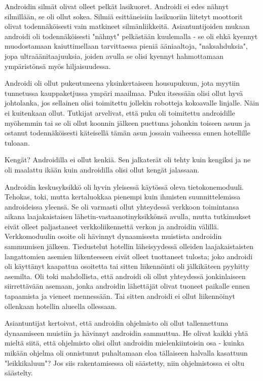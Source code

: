 Androidin silmät olivat olleet pelkät lasikuoret. Androidi ei edes nähnyt silmillään, se oli ollut sokea. Silmiä esittäneisiin lasikuoriin liitetyt moottorit olivat todennäköisesti vain matkineet silmänliikkeitä. Asiantuntijoiden mukaan androidi oli todennäköisesti "nähnyt" pelkästään kuulemalla - se oli ehkä kyennyt muodostamaan kaiuttimellaan tarvittaessa pieniä ääniaaltoja, "naksahduksia", jopa ultraäänitaajuuksia, joiden avulla se olisi kyennyt hahmottamaan ympäristönsä myös hiljaisuudessa.


Androidi oli ollut pukeutuneena yksinkertaiseen housupukuun, jota myytiin tunnetussa kauppaketjussa ympäri maailmaa. Puku itsessään olisi ollut hyvä johtolanka, jos sellainen olisi toimitettu jollekin robotteja kokoavalle linjalle. Näin ei kuitenkaan ollut. Tutkijat arvelivat, että puku oli toimitettu androidille myöhemmin tai se oli ollut koonnin jälkeen puettuna johonkin toiseen asuun ja ostanut todennäköisesti käteisellä tämän asun jossain vaiheessa ennen hotellille tuloaan.


Kengät? Androidilla ei ollut kenkiä. Sen jalkaterät oli tehty kuin kengiksi ja ne oli maalattu ikään kuin androidilla olisi ollut kengät jalassaan.


Androidin keskusyksikkö oli hyvin yleisessä käytössä oleva tietokonemoduuli. Tehokas, toki, mutta kertaluokkaa pienempi kuin ihmisten suunnittelemissa androideissa yleensä. Se oli varmasti ollut yhteydessä verkkoon toimintansa aikana laajakaistaisen lähetin-vastaanotinyksikkönsä avulla, mutta tutkimukset eivät olleet paljastaneet verkkoliikennettä verkon ja androidin välillä. Verkkomoduulin osoite oli hävinnyt dynaamisesta muistista androidin sammumisen jälkeen. Tiedustelut hotellin läheisyydessä olleiden laajakaistaisten langattomien asemien liikenteeseen eivät olleet tuottaneet tulosta; joko androidi oli käyttänyt kaapattua osoitetta tai sitten liikennöinti oli jälkikäteen pyyhitty asemilta. Oli toki mahdollista, että androidi oli ollut yhteydessä jonkinlaiseen siirrettävään asemaan, jonka androidin lähettäjät olivat tuoneet paikalle ennen tapaamista ja vieneet mennessään. Tai sitten androidi ei ollut liikennöinyt ollenkaan hotellin alueella ollessaan.


Asiantuntijat kertoivat, että androidin ohjelmisto oli ollut tallennettuna dynaamiseen muistiin ja hävinnyt androidin sammuttua. He olivat kaikki yhtä mieltä siitä, että ohjelmisto olisi ollut androidin mielenkiintoisin osa - kuinka mikään ohjelma oli onnistunut puhaltamaan eloa tällaiseen halvalla kasattuun "leikkikaluun"? Jos siis rakentamisessa oli säästetty, niin ohjelmistossa ei oltu säästelty.


